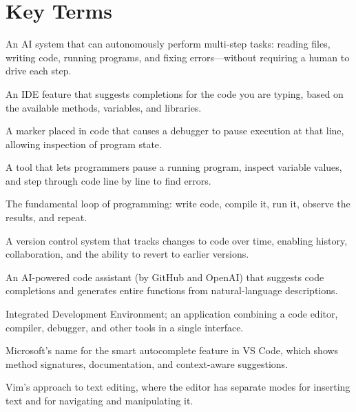 \documentclass[11pt,letterpaper]{article}
\begin{document}
\section*{Key Terms}

\begin{glossarybox}
\begin{description}[leftmargin=!, labelwidth=3.6cm, font=\bfseries\color{cssecondary}]
    \item[Agent] An AI system that can autonomously perform multi-step tasks: reading files, writing code, running programs, and fixing errors---without requiring a human to drive each step.

    \item[Autocomplete] An IDE feature that suggests completions for the code you are typing, based on the available methods, variables, and libraries.

    \item[Breakpoint] A marker placed in code that causes a debugger to pause execution at that line, allowing inspection of program state.

    \item[Debugger] A tool that lets programmers pause a running program, inspect variable values, and step through code line by line to find errors.

    \item[Edit-Compile-Run Cycle] The fundamental loop of programming: write code, compile it, run it, observe the results, and repeat.

    \item[Git] A version control system that tracks changes to code over time, enabling history, collaboration, and the ability to revert to earlier versions.

    \item[GitHub Copilot] An AI-powered code assistant (by GitHub and OpenAI) that suggests code completions and generates entire functions from natural-language descriptions.

    \item[IDE] Integrated Development Environment; an application combining a code editor, compiler, debugger, and other tools in a single interface.

    \item[IntelliSense] Microsoft's name for the smart autocomplete feature in VS Code, which shows method signatures, documentation, and context-aware suggestions.

    \item[Modal Editing] Vim's approach to text editing, where the editor has separate modes for inserting text and for navigating and manipulating it.


\end{description}
\end{glossarybox}
\end{document}
